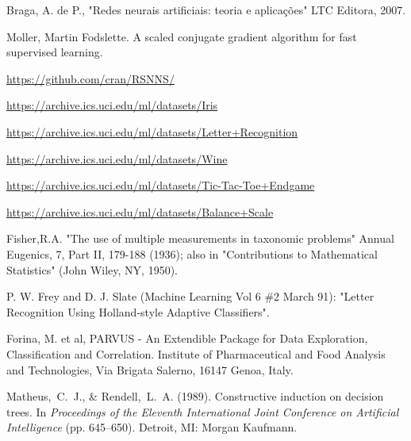\begin{thebibliography}{9}

Braga, A. de P., "Redes neurais artificiais: teoria e aplica{\c{c}}{\~o}es" LTC Editora, 2007.

Moller, Martin Fodslette. A scaled conjugate gradient algorithm for fast supervised learning.

\url{https://github.com/cran/RSNNS/}

\url{https://archive.ics.uci.edu/ml/datasets/Iris}

\url{https://archive.ics.uci.edu/ml/datasets/Letter+Recognition}

\url{https://archive.ics.uci.edu/ml/datasets/Wine}

\url{https://archive.ics.uci.edu/ml/datasets/Tic-Tac-Toe+Endgame}

\url{https://archive.ics.uci.edu/ml/datasets/Balance+Scale}

Fisher,R.A. "The use of multiple measurements in taxonomic problems"
  Annual Eugenics, 7, Part II, 179-188 (1936); also in "Contributions
  to Mathematical Statistics" (John Wiley, NY, 1950).

P. W. Frey and D. J. Slate (Machine Learning Vol 6 \#2 March 91):
	"Letter Recognition Using Holland-style Adaptive Classifiers".

Forina, M. et al, PARVUS - An Extendible Package for Data
	Exploration, Classification and Correlation. Institute of Pharmaceutical
	and Food Analysis and Technologies, Via Brigata Salerno, 
	16147 Genoa, Italy.

Matheus,~C.~J., \& Rendell,~L.~A. (1989).  Constructive
	induction on decision trees.  In {\it Proceedings of the
	Eleventh International Joint Conference on Artificial Intelligence} 
	(pp. 645--650).  Detroit, MI: Morgan Kaufmann.

\end{thebibliography}